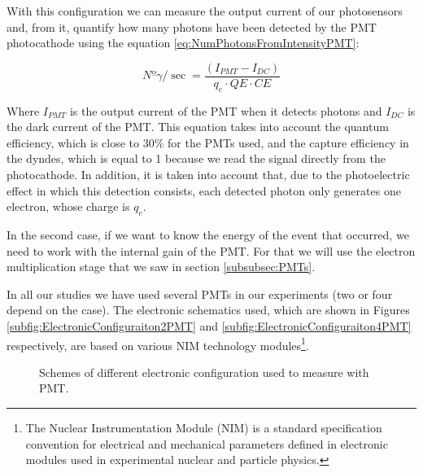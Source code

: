 With this configuration we can measure the output current of our photosensors and, from it, quantify how many photons have been detected by the PMT photocathode using the equation \ref{eq:NumPhotonsFromIntensityPMT}:

\begin{equation}
Nº\gamma/\sec = \frac{\left( I_{PMT} - I_{DC} \right)}{q_e \cdot{} QE \cdot{} CE}
\label{eq:NumPhotonsFromIntensityPMT}
\end{equation}

Where $I_{PMT}$ is the output current of the PMT when it detects photons and $I_{DC}$ is the dark current of the PMT. This equation takes into account the quantum efficiency, which is close to $30\%$ for the PMTs used, and the capture efficiency in the dyndes, which is equal to 1 because we read the signal directly from the photocathode. In addition, it is taken into account that, due to the photoelectric effect in which this detection consists, each detected photon only generates one electron, whose charge is $q_e$.

In the second case, if we want to know the energy of the event that occurred, we need to work with the internal gain of the PMT. For that we will use the electron multiplication stage that we saw in section \ref{subsubsec:PMTs}.

In all our studies we have used several PMTs in our experiments (two or four depend on the case). The electronic schematics used, which are shown in Figures \ref{subfig:ElectronicConfiguraiton2PMT} and \ref{subfig:ElectronicConfiguraiton4PMT} respectively, are based on various NIM technology modules\footnote{The Nuclear Instrumentation Module (NIM) is a standard specification convention for electrical and mechanical parameters defined in electronic modules used in experimental nuclear and particle physics.}.

\begin{figure}[h]
 \centering
    \newline
 \caption{Schemes of different electronic configuration used to measure with PMT.}
 \label{fig:ElectronicConfiguraitonsPMT}
\end{figure}

